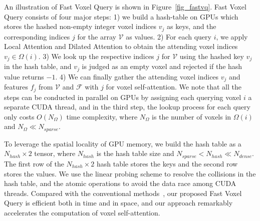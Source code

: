 \documentclass[10pt,twocolumn,letterpaper]{article}
\begin{document}
An illustration of Fast Voxel Query is shown in Figure~\ref{fig_fastvq}. Fast Voxel Query consists of four major steps: 1) we build a hash-table on GPUs which stores the hashed non-empty integer voxel indices $v_{j}$ as keys, and the corresponding indices $j$ for the array $\mathcal{V}$ as values. 2) For each query $i$, we apply Local Attention and Dilated Attention to obtain the attending voxel indices $v_{j} \in \Omega(i)$. 3) We look up the respective indices $j$ for $\mathcal{V}$ using the hashed key $v_{j}$ in the hash table, and $v_{j}$ is judged as an empty voxel and rejected if the hash value returns $-1$. 4) We can finally gather the attending voxel indices $v_{j}$ and features $f_{j}$ from $\mathcal{V}$ and $\mathcal{F}$ with $j$ for voxel self-attention. We note that all the steps can be conducted in parallel on GPUs by assigning each querying voxel $i$ a separate CUDA thread, and in the third step, the lookup process for each query only costs $O(N_{\Omega})$ time complexity, where $N_{\Omega}$ is the number of voxels in $\Omega(i)$ and $N_{\Omega} \ll N_{sparse}$.

To leverage the spatial locality of GPU memory, we build the hash table as a $N_{hash} \times 2$ tensor, where $N_{hash}$ is the hash table size and $N_{sparse} < N_{hash} \ll N_{dense}$. The first row of the $N_{hash} \times 2$ hash table stores the keys and the second row stores the values. We use the linear probing scheme to resolve the collisions in the hash table, and the atomic operations to avoid the data race among CUDA threads. Compared with the conventional methods~\cite{qi2017pointnet++, deng2020voxel}, our proposed Fast Voxel Query is efficient both in time and in space, and our approach remarkably accelerates the computation of voxel self-attention.
\end{document}
